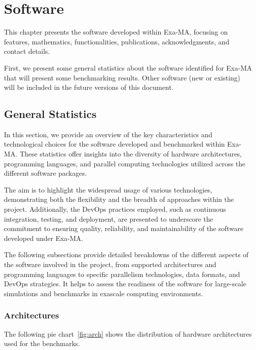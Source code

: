 \clearpage
\chapter{Software}
\label{sec:software}

This chapter presents the software developed within Exa-MA, focusing on features, mathematics, functionalities, publications, acknowledgments, and contact details.

First, we present some general statistics about the software identified for Exa-MA that will present some benchmarking results. 
Other software (new or existing) will be included in the future versions of this document.


\section{General Statistics}
\label{sec:software:statistics}

In this section, we provide an overview of the key characteristics and technological choices for the software developed and benchmarked within Exa-MA. 
These statistics offer insights into the diversity of hardware architectures, programming languages, and parallel computing technologies utilized across the different software packages. 

The aim is to highlight the widespread usage of various technologies, demonstrating both the flexibility and the breadth of approaches within the project. 
Additionally, the DevOps practices employed, such as continuous integration, testing, and deployment, are presented to underscore the commitment to ensuring quality, reliability, and maintainability of the software developed under Exa-MA.

The following subsections provide detailed breakdowns of the different aspects of the software involved in the project, from supported architectures and programming languages to specific parallelism technologies, data formats, and DevOps strategies. 
It helps to assess the readiness of the software for large-scale simulations and benchmarks in exascale computing environments.


\subsection{Architectures}

The following pie chart~\ref{fig:arch} shows the distribution of hardware architectures used for the benchmarks.

